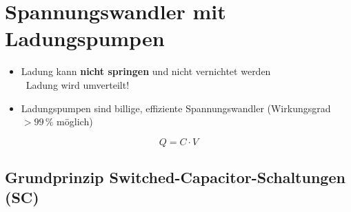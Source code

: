 \section{Spannungswandler mit Ladungspumpen}

\begin{minipage}[c]{0.72\columnwidth}
    \begin{itemize}
        \item Ladung kann \textbf{nicht springen} und nicht vernichtet werden \\
            \textrightarrow\ Ladung wird umverteilt!
        \item Ladungspumpen sind billige, effiziente Spannungswandler (Wirkungsgrad $> 99 \, \%$ möglich)
    \end{itemize}
    
\end{minipage}
\hfill
\begin{minipage}[c]{0.25\columnwidth}
    $$ \boxed{ Q = C \cdot V} $$
\end{minipage}


\subsection{Grundprinzip Switched-Capacitor-Schaltungen (SC)}

